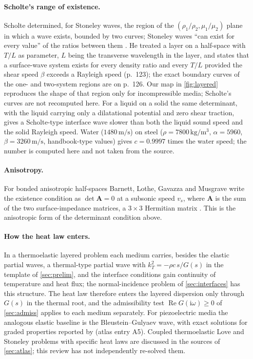 \paragraph{Scholte's range of existence.} Scholte determined, for Stoneley waves, the region of the $(\rho_1/\rho_2,\mu_1/\mu_2)$ plane in which a wave exists, bounded by two curves; Stoneley waves ``can exist for every value'' of the ratios between them \citep[p.~120]{Scholte1947}. He treated a layer on a half-space with $T/L$ as parameter, $L$ being the transverse wavelength in the layer, and states that a surface-wave system exists for every density ratio and every $T/L$ provided the shear speed $\beta$ exceeds a Rayleigh speed (p.~123); the exact boundary curves of the one- and two-system regions are on p.~126. Our map in \cref{fig:layered} reproduces the shape of that region only for incompressible media; Scholte's curves are not recomputed here. For a liquid on a solid the same determinant, with the liquid carrying only a dilatational potential and zero shear traction, gives a Scholte-type interface wave slower than both the liquid sound speed and the solid Rayleigh speed. Water ($1480\,\mathrm{m/s}$) on steel ($\rho=7800\,\mathrm{kg/m^3}$, $\alpha=5960$, $\beta=3260\,\mathrm{m/s}$, handbook-type values) gives $c=0.9997$ times the water speed; the number is computed here and not taken from the source.

\paragraph{Anisotropy.} For bonded anisotropic half-spaces Barnett, Lothe, Gavazza and Musgrave write the existence condition as $\det\mathbf A=0$ at a subsonic speed $v_s$, where $\mathbf A$ is the sum of the two surface-impedance matrices, a $3\times3$ Hermitian matrix \citep[eq.~(2.11), p.~156]{Barnett1985}. This is the anisotropic form of the determinant condition above.

\paragraph{How the heat law enters.} In a thermoelastic layered problem each medium carries, besides the elastic partial waves, a thermal-type partial wave with $k_T^2=-\rho c\,s/G(s)$ in the template of \cref{sec:prelim}, and the interface conditions gain continuity of temperature and heat flux; the normal-incidence problem of \cref{sec:interfaces} has this structure. The heat law therefore enters the layered dispersion only through $G(s)$ in the thermal root, and the admissibility test $\operatorname{Re}G(\mathrm i\omega)\ge0$ of \cref{sec:admiss} applies to each medium separately. For piezoelectric media the analogous elastic baseline is the Bleustein--Gulyaev wave, with exact solutions for graded properties reported by \citet{Collet2006} (atlas entry A5). Coupled thermoelastic Love and Stoneley problems with specific heat laws are discussed in the sources of \cref{sec:atlas}; this review has not independently re-solved them.

